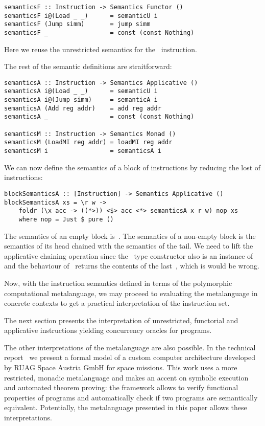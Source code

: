 \begin{verbatim}
semanticsF :: Instruction -> Semantics Functor ()
semanticsF i@(Load _ _)      = semanticU i
semanticsF (Jump simm)       = jump simm
semanticsF _                 = const (const Nothing)
\end{verbatim}

\noindent Here we reuse the unrestricted semantics for the~ instruction.

The rest of the semantic definitions are straitforward:

\begin{verbatim}
semanticsA :: Instruction -> Semantics Applicative ()
semanticsA i@(Load _ _)      = semanticU i
semanticsA i@(Jump simm)     = semanticA i
semanticsA (Add reg addr)    = add reg addr
semanticsA _                 = const (const Nothing)

semanticsM :: Instruction -> Semantics Monad ()
semanticsM (LoadMI reg addr) = loadMI reg addr
semanticsM i                 = semanticsA i
\end{verbatim}

We can now define the semantics of a block of instructions by reducing
the lost of instructions:

\begin{verbatim}
blockSemanticsA :: [Instruction] -> Semantics Applicative ()
blockSemanticsA xs = \r w ->
    foldr (\x acc -> ((*>)) <$> acc <*> semanticsA x r w) nop xs
    where nop = Just $ pure ()
\end{verbatim}

\noindent The semantics of an empty block is~. The semantics of a non-empty
block is the semantics of its head chained with the semantics of the tail. We
need to lift the applicative chaining operation since the~ type constructor
also is an instance of~ and the behaviour of~\hs{*>} returns
the contents of the last~, which is would be wrong.

Now, with the instruction semantics defined in terms of the polymorphic
computational metalanguage, we may proceed to evaluating the metalanguage
in concrete contexts to get a practical interpretation of the instruction set.

The next section presents the interpretation of unrestricted, functorial and
applicative instructions yielding concurrency oracles for programs.

The other interpretations of the metalanguage are also possible. In the technical
report~\cite{mokhov2018formal} we present a formal model of a custom computer
architecture developed by RUAG Space Austria GmbH for space missions.
This work uses a more restricted, monadic metalanguage and makes an accent on
symbolic execution and automated theorem proving: the framework allows to verify
functional properties of programs and automatically check if two programs are
semantically equivalent. Potentially, the metalanguage presented in this paper
allows these interpretations.